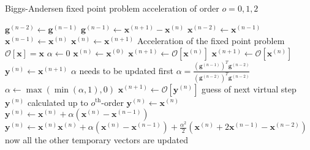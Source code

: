 \begin{algorithm}[thb]
\caption{Biggs-Andersen  fixed point problem acceleration of order $o=0,1,2$ }\label{Biggs_Andersen}
\begin{algorithmic}[1]
    \State $\mathbf{g}^{(n-2)} \gets \mathbf{g}^{(n-1)}$
    \State $\mathbf{g}^{(n-1)} \gets \mathbf{x}^{(n+1)}-\mathbf{x}^{(n)}$
    \State $\mathbf{x}^{(n-2)} \gets \mathbf{x}^{(n-1)}$
    \State $\mathbf{x}^{(n-1)} \gets \mathbf{x}^{(n)}$
    \State $\mathbf{x}^{(n)} \gets \mathbf{x}^{(n+1)}$
\EndProcedure
\State \Comment Acceleration of the fixed point problem $\mathcal{O}[\mathbf{x}]=\mathbf{x}$
\State $\alpha \gets 0$
\State $\mathbf{x}^{(n)} \gets \mathbf{x}^{(0)}$
\State $\mathbf{x}^{(n+1)} \gets \mathcal{O}[\mathbf{x}^{(n)}]$
\State {}
\State $\mathbf{x}^{(n+1)} \gets \mathcal{O}[\mathbf{x}^{(n)}]$
\State {}
\State $\mathbf{y}^{(n)} \gets  \mathbf{x}^{(n+1)}$
    \State \Comment $\alpha$ needs to be updated first
    \State $\alpha = \frac{\left(\mathbf{g}^{(n-1)}\right)^T\mathbf{g}^{(n-2)}}{\left(\mathbf{g}^{(n-2)}\right)^T\mathbf{g}^{(n-2)}}$
    \State $\alpha \gets \max (\min (\alpha,1),0)$
    \State $\mathbf{x}^{(n+1)} \gets \mathcal{O}[\mathbf{y}^{(n)}]$
    \State \Comment  guess of next virtual step $\mathbf{y}^{(n)}$ calculated up to $o^\mathrm{th}$-order
        \State $\mathbf{y}^{(n)} \gets \mathbf{x}^{(n)}$
        \State $\mathbf{y}^{(n)} \gets \mathbf{x}^{(n)} + \alpha \left(\mathbf{x}^{(n)}-\mathbf{x}^{(n-1)}\right)$
    \Else
        \State $\mathbf{y}^{(n)} \gets \mathbf{x}^{(n)}\mathbf{x}^{(n)} + \alpha \left(\mathbf{x}^{(n)}-\mathbf{x}^{(n-1)}\right)
                                                                        + \frac{\alpha^2}{2}\left(\mathbf{x}^{(n)}+2\mathbf{x}^{(n-1)}-\mathbf{x}^{(n-2)}\right)$
    \EndIf
    \State \Comment now all the other temporary vectors are updated
    \State {}

\EndWhile
\EndProcedure
\end{algorithmic}
\end{algorithm}

